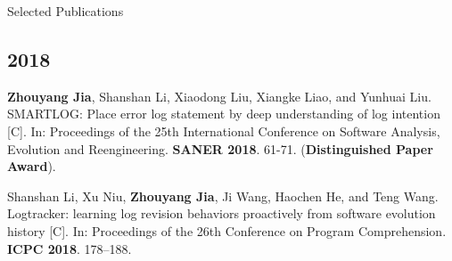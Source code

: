 \documentclass{resume}
\begin{document}
\begin{rSection}{Selected Publications}
    \subsection*{2018}

    \textbf{Zhouyang Jia}, Shanshan Li, Xiaodong Liu, Xiangke Liao, and Yunhuai Liu. SMARTLOG: Place error log statement by deep understanding of log intention [C]. In: Proceedings of the 25th International Conference on Software Analysis, Evolution and Reengineering. \textbf{SANER 2018}. 61-71. (\textbf{Distinguished Paper Award}).

    Shanshan Li, Xu Niu, \textbf{Zhouyang Jia}, Ji Wang, Haochen He, and Teng Wang. Logtracker: learning log revision behaviors proactively from software evolution history [C]. In: Proceedings of the 26th Conference on Program Comprehension. \textbf{ICPC 2018}. 178–188.
\end{rSection}
\end{document}
